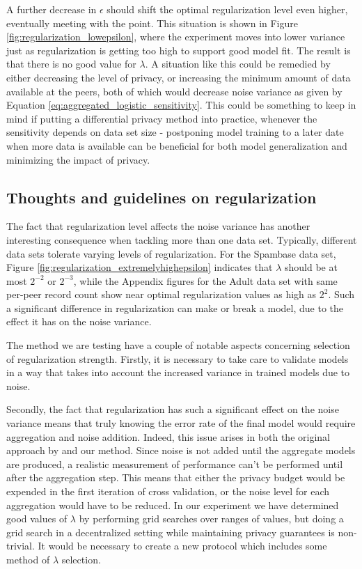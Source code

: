 A further decrease in $\epsilon$ should shift the optimal regularization level even higher, eventually meeting with the point. This situation is shown in Figure \ref{fig:regularization_lowepsilon}, where the experiment moves into lower variance just as regularization is getting too high to support good model fit. The result is that there is no good value for $\lambda$. A situation like this could be remedied by either decreasing the level of privacy, or increasing the minimum amount of data available at the peers, both of which would decrease noise variance as given by Equation \ref{eq:aggregated_logistic_sensitivity}. This could be something to keep in mind if putting a differential privacy method into practice, whenever the sensitivity depends on data set size - postponing model training to a later date when more data is available can be beneficial for both model generalization and minimizing the impact of privacy.

\subsection{Thoughts and guidelines on regularization}
\label{sec:reg_thoughts_guidelines}
The fact that regularization level affects the noise variance has another interesting consequence when tackling more than one data set. Typically, different data sets tolerate varying levels of regularization. For the Spambase data set, Figure \ref{fig:regularization_extremelyhighepsilon} indicates that $\lambda$ should be at most $2^{-2}$ or $2^{-3}$, while the Appendix figures for the Adult data set with same per-peer record count show near optimal regularization values as high as $2^2$. Such a significant difference in regularization can make or break a model, due to the effect it has on the noise variance.

The method we are testing have a couple of notable aspects concerning selection of regularization strength. Firstly, it is necessary to take care to validate models in a way that takes into account the increased variance in trained models due to noise.

Secondly, the fact that regularization has such a significant effect on the noise variance means that truly knowing the error rate of the final model would require aggregation and noise addition. Indeed, this issue arises in both the original approach by \cite{pathak2010diffprivhomo} and our method. Since noise is not added until the aggregate models are produced, a realistic measurement of performance can't be performed until after the aggregation step. This means that either the privacy budget would be expended in the first iteration of cross validation, or the noise level for each aggregation would have to be reduced. In our experiment we have determined good values of $\lambda$ by performing grid searches over ranges of values, but doing a grid search in a decentralized setting while maintaining privacy guarantees is non-trivial. It would be necessary to create a new protocol which includes some method of $\lambda$ selection. 

